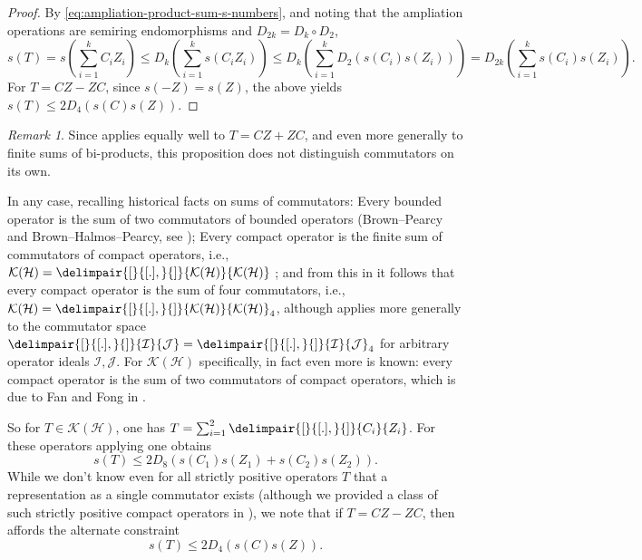\documentclass[10pt,reqno]{amsart}
\theoremstyle{remark}
\newtheorem{remark}[theorem]{Remark}
\newcommand{\KH}{\mathcal{K}(\Hil)}
\newcommand{\Hil}{\mathcal{H}}
\newcommand{\comm}{\delimpair{[}{[.],}{]}}
\newcommand{\I}{\mathcal{I}}
\newcommand{\J}{\mathcal{J}}
\numberwithin{equation}{section}
\begin{document}
\begin{proof}
  By \eqref{eq:ampliation-product-sum-s-numbers}, and noting that the ampliation operations are semiring endomorphisms and $D_{2k} = D_k \circ D_2$,
  \begin{equation*}
    s(T) = s \left( \sum_{i=1}^k C_i Z_i \right) \le D_k \left( \sum_{i=1}^k s (C_i Z_i) \right) \le D_k \left( \sum_{i=1}^k D_2 (s(C_i) s(Z_i)) \right) = D_{2k} \left( \sum_{i=1}^k s(C_i) s(Z_i) \right).
  \end{equation*}
  For $T = CZ - ZC$, since $s(-Z) = s(Z)$, the above yields $s(T) \le 2 D_4(s(C) s(Z))$.
\end{proof}

\begin{remark}
  \label{sums of bi-products}
  Since  applies equally well to $T = CZ + ZC$, and even more generally to finite sums of bi-products, this proposition does not distinguish commutators on its own.
\end{remark}

In any case, recalling historical facts on sums of commutators:
Every bounded operator is the sum of two commutators of bounded operators (Brown--Pearcy and Brown--Halmos--Pearcy, see \cite[p.\,248, paragraph below Problem 1, and citations]{PT-1971-MMJ});
Every compact operator is the finite sum of commutators of compact operators, i.e., $\KH = \comm{\KH}{\KH}$ \cite[Theorem 1]{PT-1971-MMJ};
and from this in \cite[Corollary~6.5]{DFWW-2004-AM} it follows that every compact operator is the sum of four commutators, i.e., $\KH = \comm{\KH}{\KH}_4$, although \cite[Corollary~6.5]{DFWW-2004-AM} applies more generally to the commutator space $\comm{\I}{\J} = \comm{\I}{\J}_4$ for arbitrary operator ideals $\I,\J$.
For $\KH$ specifically, in fact even more is known: every compact operator is the sum of two commutators of compact operators, which is due to Fan and Fong in \cite{FF-1987-PRIA}.

So for $T \in \KH$, one has $T = \sum^2_{i = 1}\comm{C_i}{Z_i}$.
For these operators applying  one obtains
\begin{equation}
  \label{eq:D8-constraint}
  s(T) \le 2 D_8 (s(C_1) s(Z_1) + s(C_2) s(Z_2)).
\end{equation}
While we don't know even for all strictly positive operators $T$ that a representation as a single commutator exists (although we provided a class of such strictly positive compact operators in ), we note that if $T = CZ - ZC$, then  affords the alternate constraint
\begin{equation}
  \label{eq:D4-constraint}
  s(T)  \le 2 D_4 (s(C)s(Z)).
\end{equation}
\end{document}
